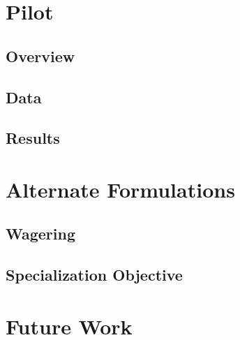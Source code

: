 \documentclass{article}
\begin{document}


\section{Pilot}

\subsection{Overview}



\subsection{Data}

\subsection{Results}

\section{Alternate Formulations}

\subsection{Wagering}

\subsection{Specialization Objective}

\section{Future Work}



\newpage

\appendix
\appendixpage
\addappheadtotoc


% 

\end{document}
